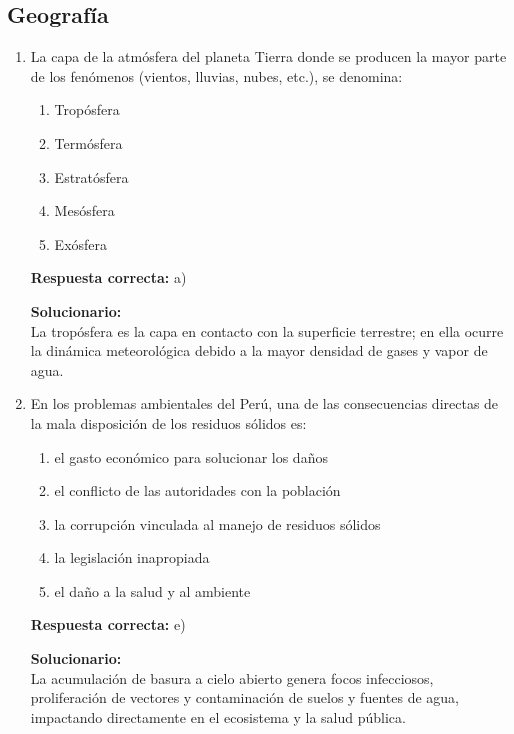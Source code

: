 \subsection*{Geografía}

\begin{enumerate}
	\item La capa de la atmósfera del planeta Tierra donde se producen la mayor parte de los fenómenos (vientos, lluvias, nubes, etc.), se denomina:
	\begin{enumerate}[label=\alph*)]
		\item Tropósfera
		\item Termósfera
		\item Estratósfera
		\item Mesósfera
		\item Exósfera
	\end{enumerate}
	\textbf{Respuesta correcta:} a)
	
	\vspace{2mm}
	\textbf{Solucionario:}\\
	La tropósfera es la capa en contacto con la superficie terrestre; en ella ocurre la dinámica meteorológica debido a la mayor densidad de gases y vapor de agua.
	
	\vspace{6mm}
	
	\item En los problemas ambientales del Perú, una de las consecuencias directas de la mala disposición de los residuos sólidos es:
	\begin{enumerate}[label=\alph*)]
		\item el gasto económico para solucionar los daños
		\item el conflicto de las autoridades con la población
		\item la corrupción vinculada al manejo de residuos sólidos
		\item la legislación inapropiada
		\item el daño a la salud y al ambiente
	\end{enumerate}
	\textbf{Respuesta correcta:} e)
	
	\vspace{2mm}
	\textbf{Solucionario:}\\
	La acumulación de basura a cielo abierto genera focos infecciosos, proliferación de vectores y contaminación de suelos y fuentes de agua, impactando directamente en el ecosistema y la salud pública.
	
	\vspace{6mm}
	

\end{enumerate}
